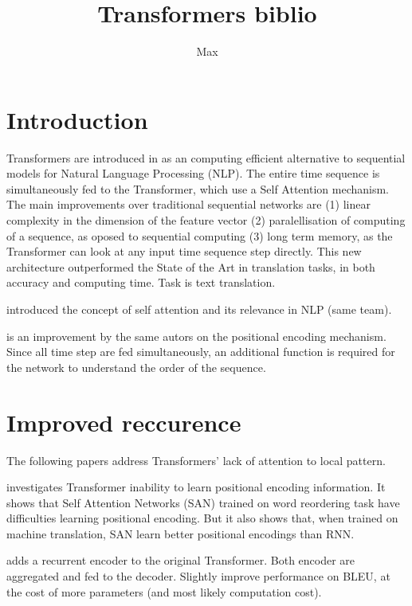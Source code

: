 \documentclass{report}
\title{Transformers biblio}
\author{Max}
\begin{document}
\maketitle

\section{Introduction}

    Transformers are introduced in \cite{Vaswani2017AttentionIA} as an computing efficient alternative to sequential models for Natural Language Processing (NLP). The entire time sequence is simultaneously fed to the Transformer, which use a Self Attention mechanism. The main improvements over traditional sequential networks are (1) linear complexity in the dimension of the feature vector (2) paralellisation of computing of a sequence, as oposed to sequential computing (3) long term memory, as the Transformer can look at any input time sequence step directly. This new architecture outperformed the State of the Art in translation tasks, in both accuracy and computing time. Task is text translation.

    \cite{Parikh2016ADA} introduced the concept of self attention and its relevance in NLP (same team).

    \cite{Shaw2018SelfAttentionWR} is an improvement by the same autors on the positional encoding mechanism. Since all time step are fed simultaneously, an additional function is required for the network to understand the order of the sequence.


\section{Improved reccurence}

    The following papers address Transformers' lack of attention to local pattern.

    \cite{Yang2019AssessingTA} investigates Transformer inability to learn positional encoding information. It shows that Self Attention Networks (SAN) trained on word reordering task have difficulties learning positional encoding. But it also shows that, when trained on machine translation, SAN learn better positional encodings than RNN.

    \cite{Hao2019ModelingRF} adds a recurrent encoder to the original Transformer. Both encoder are aggregated and fed to the decoder. Slightly improve performance on BLEU, at the cost of more parameters (and most likely computation cost).
\end{document}
